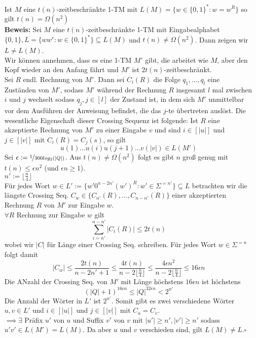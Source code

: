 \begin{satz}{}
    Ist $M$ eine $t(n)$-zeitbeschränkte 1-TM mit $L(M) = \{w \in \{0, 1\}^* : w = w^R\}$ so gilt $t(n) = \Omega(n^2)$\\
    
    \textbf{Beweis:} Sei $M$ eine $t(n)$-zeitbeschränkte 1-TM mit Eingabealphabet $\{0, 1\}, L = \{w w^r : w \in \{0, 1\}^*\} \subseteq L(M)$ und $t(n) \neq \Omega(n^2)$. Dann zeigen wir $L \neq L(M)$.\\
    Wir können annehmen, dass es eine 1-TM $M'$ gibt, die arbeitet wie $M$, aber  den Kopf wieder an den Anfang fährt und $M'$ ist $2t(n)$-zeitbeschränkt.\\
    Sei $R$ endl. Rechnung von $M'$.
    Dann sei $C_i(R)$ die Folge $q_1, ..., q_l$ eine Zuständen von $M'$, sodass $M'$ während der Rechnung $R$ insgesamt $l$ mal zwischen $i$ und $j$ wechselt sodass $q_j, j \in [l]$ der Zustand ist, in dem sich $M'$ unmittelbar vor dem Ausführen der Anweisung befindet, die das $j$-te übertreten auslöst. Die wesentliche Eigenschaft dieser Crossing Sequenz ist folgende: Ist $R$ eine akzeptierte Rechnung von $M'$ zu einer Eingabe $v$ und sind $i \in [|u|]$ und $j \in [|v|]$ mit $C_i(R) = C_j(s)$, so gilt
    $$ u(1) ... u(i) u(j+1) ... v(|v|) \in L(M') $$
    Sei $\epsilon := \nicefrac{1}{300 log_2(|Q|)}$. Aus $t(n) \neq \Omega(n^2)$ folgt es gibt $n$ groß genug mit $t(n) \leq \epsilon n^2$ (und $\epsilon n \geq 1$).\\
    $n' := \lfloor \frac{n}{4} \rfloor$\\
    Für jedes Wort $w \in L' := \{w' 0^{n-2n'}(w')^R : w' \in \Sigma^{=n'}\} \subseteq L$ betrachten wir die längste Crossing Seq. $C_w \in \{C_{n'}(R), ..., C_{n-n'}(R)\}$ einer akzeptierten Rechnung $R$ von $M'$ zur Eingabe $w$.\\
    $\forall R$ Rechnung zur Eingabe $w$ gilt\\
    $$ \overset{n-n'}{\underset{i=n'}{\sum}} |C_i(R)| \leq 2 t(n) $$
    wobei wir $|C|$ für Länge einer Crossing Seq. schreiben. Für jedes Wort $w \in \Sigma^{=n}$ folgt damit
    $$ |C_w| \leq \frac{2 t(n)}{n-2n' + 1} \leq \frac{4 t(n)}{n-2 \lfloor \frac{n}{4} \rfloor} \leq \frac{4 \epsilon n^2}{n-2 \lfloor \frac{n}{4} \rfloor} \leq 16 \epsilon n $$
    Die ANzahl der Crossing Seq. von $M'$ mit Länge höchstens $16 \epsilon n$ ist höchstens
    $$ (|Q| + 1)^{16 \epsilon n} \leq |Q|^{32 \epsilon n} < 2^{n'} $$
    Die Anzahl der Wörter in $L'$ ist $2^{n'}$. Somit gibt es zwei verschiedene Wörter $u, v \in L'$ und $i \in [|u|]$ und $j \in [|v|]$ mit $C_u = C_v$.\\
    $\implies \exists$ Präfix $u'$ von $u$ und Suffix $v'$ von $v$ mit $|u'| \geq n', |v'| \geq n'$ sodass $u' v' \in L(M') = L(M)$. Da aber $u$ und $v$ verschieden sind, gilt $L(M) \neq L$.\hspace*{\fill}$\square$
\end{satz}


